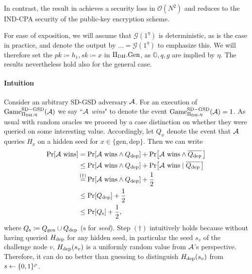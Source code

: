 In contrast, the result in \cite{ttkem} achieves a security loss in $\mathcal{O}(N^2)$ and reduces to the IND-CPA security of the public-key encryption scheme.

For ease of exposition, we will assume that $\mathcal{G}(1^\eta)$ is deterministic, as is the case in practice, and denote the output by $\ldots = \mathcal{G}(1^\eta)$ to emphasize this. We will therefore set the $pk \coloneqq h_1, sk \coloneqq x$ in $\Pi_{\mathrm{DH}}.\mathrm{Gen}$, as $\mathbb{G}, q, g$ are implied by $\eta$. The results nevertheless hold also for the general case.

\paragraph{Intuition}
Consider an arbitrary SD-GSD adversary $\mathcal{A}$. For an execution of $\mathrm{Game}_{\Pi_{\mathrm{DH}}, \eta}^{\mathrm{SD-GSD}}(\mathcal{A})$ we say ``\emph{$\mathcal{A}$ wins}" to denote the event $\mathrm{Game}_{\Pi_{\mathrm{DH}}, \eta}^{\mathrm{SD-GSD}}(\mathcal{A}) = 1$.
As usual with random oracles we proceed by a case distinction on whether they were queried on some interesting value. Accordingly, let $Q_{x}$ denote the event that $\mathcal{A}$ queries $H_{x}$ on a hidden seed for $x \in \{\mathrm{gen}, \mathrm{dep}\}$. Then we can write
\begin{align} \label{eq:theorem-sd-gsd-security-win-cases}
	\begin{split}
		\pr{\wins} & = \pr{\wins \land \qdep} + \pr{\wins \land \overline{\qdep} \,} \\
		& \le \pr{\wins \land \qdep} + \pr{\wins \mid \overline{\qdep} \,} \\
		& \stackrel{\mathclap{(\dagger)}}{=}  \pr{\wins \land \qdep} + \frac{1}{2}         \\
		& \le \pr{\qdep} + \frac{1}{2} \\
		& \le \pr{\qs} + \frac{1}{2},
	\end{split}
\end{align}
where $Q_\mathrm{s} \coloneqq Q_\mathrm{gen} \cup Q_\mathrm{dep}$ ($\mathrm{s}$ for \emph{seed}). Step $(\dagger)$ intuitively holds because without having queried $H_\mathrm{dep}$ for any hidden seed, in particular the seed $s_v$ of the challenge node $v$, $H_\mathrm{dep}(s_v)$ is a uniformly random value from $\mathcal{A}$'s perspective. Therefore, it can do no better than guessing to distinguish $H_\mathrm{dep}(s_v)$ from $s \leftarrow \{0, 1\}^\rho$.


